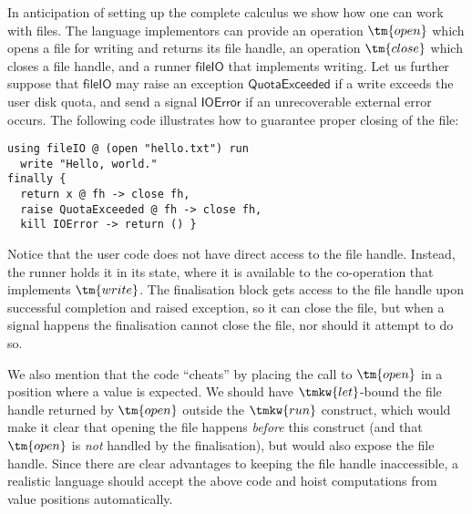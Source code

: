 \begin{example}
  \label{ex:file-IO}%
  In anticipation of setting up the complete calculus we show how one can work with files.
  The language implementors can provide an operation $\tm{open}$ which opens a
  file for writing and returns its file handle, an operation $\tm{close}$ which closes a
  file handle, and a runner $\mathsf{fileIO}$ that implements
  writing.
  Let us further suppose that $\mathsf{fileIO}$ may raise
  an exception $\mathsf{QuotaExceeded}$ if a write exceeds the user disk quota,
  and send a signal $\mathsf{IOError}$ 
  if an unrecoverable external error occurs.
  The following code illustrates how to guarantee proper closing of the file:
\begin{lstlisting}
using fileIO @ (open "hello.txt") run
  write "Hello, world."
finally {
  return x @ fh -> close fh,
  raise QuotaExceeded @ fh -> close fh,
  kill IOError -> return () }
\end{lstlisting}
  Notice that the user code does not have direct access to the file handle.
  Instead, the runner holds it in its state, where it is available to the
  co-operation that implements $\tm{write}$. The finalisation block gets access to
  the file handle upon successful completion and raised exception, so it can close
  the file, but when a signal happens the finalisation cannot close the file,
  nor should it attempt to do so.

  We also mention that the code ``cheats'' by placing the call to $\tm{open}$ in a
  position where a value is expected. We should have $\tmkw{let}$-bound the file handle
  returned by $\tm{open}$ outside the $\tmkw{run}$ construct, which would make it clear that
  opening the file happens \emph{before} this construct (and that $\tm{open}$ is
  \emph{not} handled by the finalisation), but would also expose the file handle. Since
  there are clear advantages to keeping the file handle inaccessible, a realistic
  language should accept the above code and hoist computations from value positions
  automatically.
\end{example}

